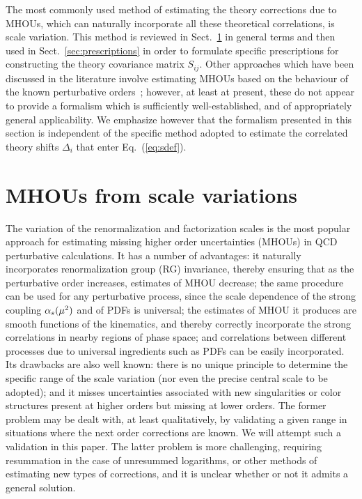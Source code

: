 The most commonly used method of estimating the theory
corrections due to MHOUs, which can naturally incorporate all these
theoretical correlations, is scale variation.
%
This method is reviewed in Sect.~\ref{sec:scalevarn} in general terms and 
then used in Sect.~\ref{sec:prescriptions} in order to formulate
specific prescriptions for constructing the theory covariance matrix $S_{ij}$.
%
Other approaches which have been
discussed in the literature involve estimating MHOUs based on the
behaviour of the known perturbative
orders~\cite{Cacciari:2011ze,David:2013gaa,Bagnaschi:2014wea};
however, at least at present, these do not appear to provide a
formalism which is sufficiently well-established, and of appropriately
general applicability.
%
We emphasize however that the formalism presented in this section is independent of the specific method
adopted to estimate the correlated theory shifts $\Delta_i$ that enter Eq.~(\ref{eq:sdef}).
\section{MHOUs from scale variations}
\label{sec:scalevarn}

The variation of the renormalization and factorization scales is the most popular 
approach for estimating missing higher order uncertainties (MHOUs) in
QCD perturbative calculations.
%
It has a number of 
advantages: it naturally incorporates renormalization group (RG) invariance, 
thereby ensuring that as the perturbative order increases, estimates of MHOU 
decrease; the same procedure can be used for any perturbative process, since 
the scale dependence of the strong coupling $\alpha_s(\mu^2)$ and of PDFs
is universal; the 
estimates of MHOU it produces are smooth functions of the kinematics, and 
thereby correctly incorporate the strong correlations in nearby regions of 
phase space; and correlations between different processes due to universal ingredients 
such as PDFs can be easily incorporated.
%
Its drawbacks are also well known: 
there is no unique principle to determine the specific range of the scale variation (nor 
even the precise central scale to be adopted); and it misses uncertainties 
associated with new singularities or color structures present at higher orders but 
missing at lower orders.
%
The former problem may be dealt with, at least 
qualitatively, by validating a given range in situations where the next order 
corrections are known.
%
We will attempt such a validation in this paper.
%
The  latter problem is more challenging, requiring resummation in the case of 
unresummed logarithms, or other methods of estimating new types of
corrections, and it is unclear whether or not it admits a general solution.

